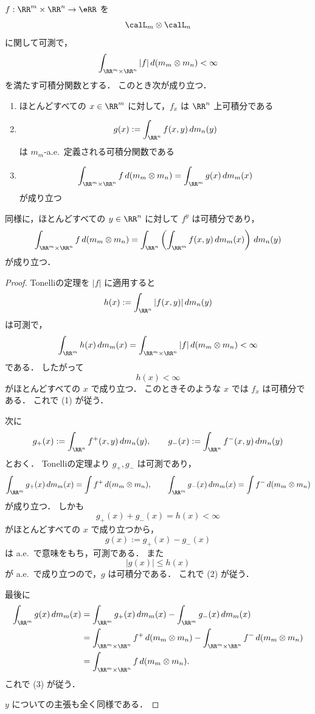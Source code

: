 \begin{theorem}[Fubiniの定理]
$f:\RR^m\times\RR^n\to\eRR$ を
\[
\calL_m\otimes\calL_n
\]
に関して可測で，
\[
\int_{\RR^m\times\RR^n}|f|\,d(m_m\otimes m_n)<\infty
\]
を満たす可積分関数とする．
このとき次が成り立つ．
\begin{enumerate}
    \item ほとんどすべての $x\in\RR^m$ に対して，$f_x$ は $\RR^n$ 上可積分である
    \item
    \[
    g(x):=\int_{\RR^n}f(x,y)\,dm_n(y)
    \]
    は $m_m$-a.e.\ 定義される可積分関数である
    \item
    \[
    \int_{\RR^m\times\RR^n}f\,d(m_m\otimes m_n)
    =
    \int_{\RR^m}g(x)\,dm_m(x)
    \]
    が成り立つ
\end{enumerate}
同様に，ほとんどすべての $y\in\RR^n$ に対して $f^y$ は可積分であり，
\[
\int_{\RR^m\times\RR^n}f\,d(m_m\otimes m_n)
=
\int_{\RR^n}\left(\int_{\RR^m}f(x,y)\,dm_m(x)\right)\,dm_n(y)
\]
が成り立つ．
\end{theorem}
\begin{proof}
Tonelliの定理を $|f|$ に適用すると
\[
h(x):=\int_{\RR^n}|f(x,y)|\,dm_n(y)
\]
は可測で，
\[
\int_{\RR^m}h(x)\,dm_m(x)
=
\int_{\RR^m\times\RR^n}|f|\,d(m_m\otimes m_n)
<
\infty
\]
である．
したがって
\[
h(x)<\infty
\]
がほとんどすべての $x$ で成り立つ．
このときそのような $x$ では $f_x$ は可積分である．
これで (1) が従う．

次に
\[
g_+(x):=\int_{\RR^n}f^+(x,y)\,dm_n(y),
\qquad
g_-(x):=\int_{\RR^n}f^-(x,y)\,dm_n(y)
\]
とおく．
Tonelliの定理より $g_+,g_-$ は可測であり，
\[
\int_{\RR^m}g_+(x)\,dm_m(x)=\int f^+\,d(m_m\otimes m_n),
\qquad
\int_{\RR^m}g_-(x)\,dm_m(x)=\int f^-\,d(m_m\otimes m_n)
\]
が成り立つ．
しかも
\[
g_+(x)+g_-(x)=h(x)<\infty
\]
がほとんどすべての $x$ で成り立つから，
\[
g(x):=g_+(x)-g_-(x)
\]
は a.e.\ で意味をもち，可測である．
また
\[
|g(x)|\le h(x)
\]
が a.e.\ で成り立つので，$g$ は可積分である．
これで (2) が従う．

最後に
\begin{align*}
\int_{\RR^m}g(x)\,dm_m(x)
&=
\int_{\RR^m}g_+(x)\,dm_m(x)-\int_{\RR^m}g_-(x)\,dm_m(x) \\
&=
\int_{\RR^m\times\RR^n}f^+\,d(m_m\otimes m_n)
-\int_{\RR^m\times\RR^n}f^-\,d(m_m\otimes m_n) \\
&=
\int_{\RR^m\times\RR^n}f\,d(m_m\otimes m_n).
\end{align*}
これで (3) が従う．

$y$ についての主張も全く同様である．
\end{proof}

